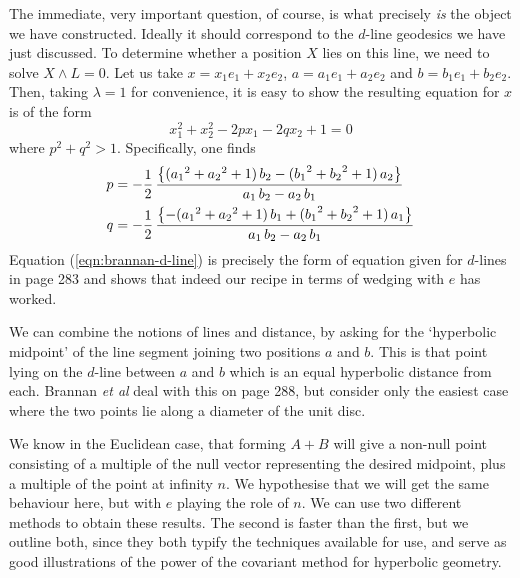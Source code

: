 The immediate, very important question, of course, is
what precisely {\em is\/} the object we have constructed.
Ideally it should correspond to the $d$-line geodesics we
have just discussed. To determine whether a position $X$
lies on this line, we need to solve $X\wedge L=0$. Let us
take $x=x_1 e_1 + x_2 e_2$, $a=a_1 e_1 + a_2 e_2$ and
$b=b_1 e_1 + b_2 e_2$. Then, taking $\lambda=1$ for
convenience,  it is easy to show the resulting equation
for $x$ is of the form
%
\begin{equation}\label{eqn:brannan-d-line}
x_1^2+x_2^2-2 p x_1 -2 q x_2 +1 =0
\end{equation}
%
where $p^2+q^2>1$. Specifically, one finds
%
\begin{align}
p &= -\frac{1}{2}\,\frac {\left\{({a_1}^2+{a_2}^2
+1)\,b_2 - ({b_1}^2+{b_2}^2 +1)\,a_2\right\}}{ a_1\, b_2-
a_2\, b_1} \nn \\
%
q &= -\frac{1}{2}\,{\frac {\left\{-({a_1}^2+{a_2}^2
+1)\,b_1 + ({b_1}^2+{b_2}^2 +1)\,a_1\right\}}{{ a_1}\,{
b_2}-{ a_2}\,{ b_1}}} \nn
%
\end{align}
%
Equation (\ref{eqn:brannan-d-line}) is precisely the form
of equation given for $d$-lines in \cite{GEOM:brannan} page 283 and shows that
indeed our recipe in terms of wedging with $e$ has worked.

We can combine the notions of lines and distance, by asking for
the `hyperbolic midpoint' of the line segment joining two
positions $a$ and $b$. This is that point lying on the $d$-line
between $a$ and $b$ which is an equal hyperbolic distance from
each. Brannan \emph{et al} deal with this on page 288\cite{GEOM:brannan}, but consider only
the easiest case where the two points lie along a diameter of the
unit disc.

We know in the Euclidean case, that forming $A+B$ will give a
non-null point consisting of a multiple of the null vector
representing the desired midpoint, plus a multiple of the point at
infinity $n$. We hypothesise that we will get the same behaviour
here, but with $e$ playing the role of $n$. We can use two
different methods to obtain these results. The second is faster
than the first, but we outline both, since they both typify the
techniques available for use, and serve as good illustrations of
the power of the covariant method for hyperbolic geometry.


